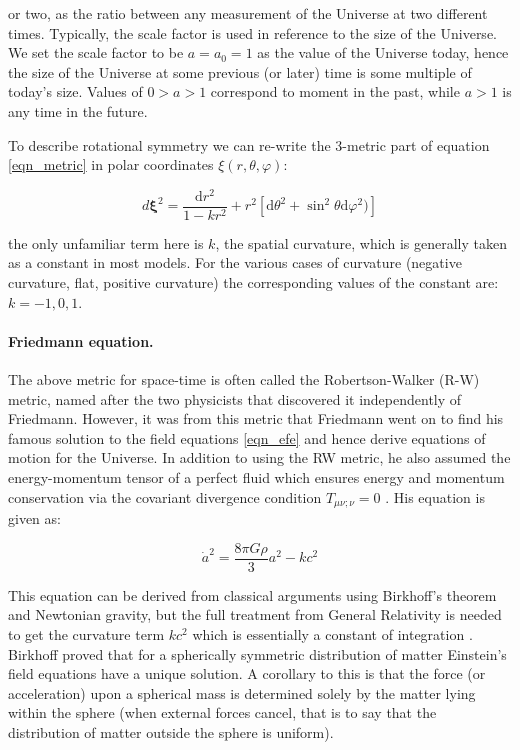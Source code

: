 \noindent or two, as the ratio between any measurement of the Universe at two different times. Typically, the scale factor is used in reference to the size of the Universe. We set the scale factor to be $ a = a_0 = 1$ as the value of the Universe today, hence the size of the Universe at some previous (or later) time is some multiple of today's size. Values of $0 > a > 1$ correspond to moment in the past, while $a > 1$ is any time in the future.

To describe rotational symmetry we can re-write the 3-metric part of equation \ref{eqn_metric} in polar coordinates $ \xi(r,\theta,\varphi)$:

\begin{equation}
d\mathbf{\xi}^2 = \frac{\mathrm{d}r^2}{1-k r^2} + r^2 [\mathrm{d}\theta^2 + \sin^2 \theta \mathrm{d}\varphi^2)]
\end{equation}

\noindent the only unfamiliar term here is $k$, the spatial curvature, which is generally taken as a constant in most models. For the various cases of curvature (negative curvature, flat, positive curvature) the corresponding values of the constant are: $k= -1, 0, 1$. 

\paragraph{Friedmann equation.} The above metric for space-time is often called the Robertson-Walker (R-W) metric, named after the two physicists that discovered it independently of Friedmann. However, it was from this metric that Friedmann went on to find his famous solution to the field equations \ref{eqn_efe} and hence derive equations of motion for the Universe. In addition to using the RW metric, he also assumed the energy-momentum tensor of a perfect fluid which ensures energy and momentum conservation via the covariant divergence condition $T_{\mu\nu;\nu} = 0$ \citep{bib_schutz}. His equation is given as:

\begin{equation}
\label{eqn_fre}
\dot a^2 = \frac{8\pi G\rho}{3} a^2 - kc^2
\end{equation}

\noindent This equation can be derived from classical arguments using Birkhoff's theorem and Newtonian gravity, but the full treatment from General Relativity is needed to get the curvature term $kc^2$ which is essentially a constant of integration \citep{bib_pea}. Birkhoff proved that for a spherically symmetric distribution of matter Einstein's field equations have a unique solution. A corollary to this is that the force (or acceleration) upon a spherical mass is determined solely by the matter lying within the sphere (when external forces cancel, that is to say that the distribution of matter outside the sphere is uniform).

